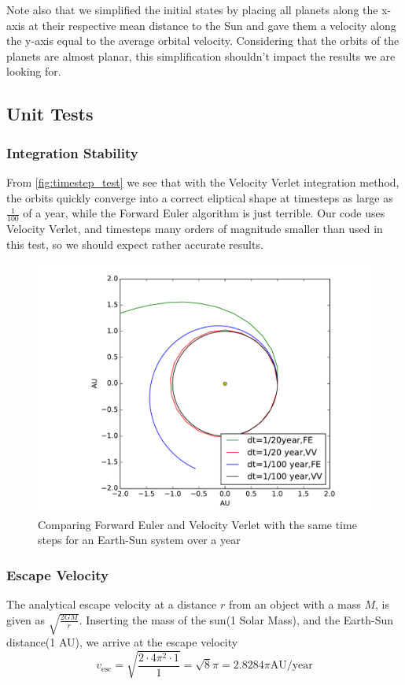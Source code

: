 \documentclass[a4paper]{article}
\begin{document}
Note also that we simplified the initial states by placing all planets along the x-axis at their respective mean distance to the Sun and gave them a velocity along the y-axis equal to the average orbital velocity. Considering that the orbits of the planets are almost planar, this simplification shouldn't impact the results we are looking for.


\subsection{Unit Tests}
\subsubsection{Integration Stability}
From \vref{fig:timestep_test} we see that with the Velocity Verlet integration method, the orbits quickly converge into a correct eliptical shape at timesteps as large as $\frac{1}{100}$ of a year, while the Forward Euler algorithm is just terrible. Our code uses Velocity Verlet, and timesteps many orders of magnitude smaller than used in this test, so we should expect rather accurate results.\\


\begin{figure}[ht]
\includegraphics[width=\textwidth]{fig/timestep_test.pdf}
\caption{Comparing Forward Euler and Velocity Verlet with the same time steps for an Earth-Sun system over a year}
\label{fig:timestep_test}
\end{figure}


\subsubsection{Escape Velocity}
The analytical escape velocity at a distance $r$ from an object with a mass $M$, is given as $\sqrt{\frac{2GM}{r}}$. Inserting the mass of the sun(1 Solar Mass), and the Earth-Sun distance(1 AU), we arrive at the escape velocity
\begin{equation}
v_{\mathrm{esc}} = \sqrt{\frac{2\cdot 4\pi^2 \cdot 1}{1}} = \sqrt{8}\pi = 2.8284\pi \mathrm{AU}/\mathrm{year} \label{eq:escape_velocity}
\end{equation}
\end{document}
